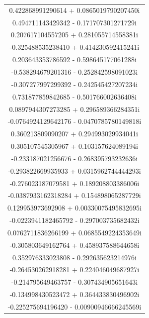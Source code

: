 \documentclass[12pt,a4paper,UTF8]{ctexart}
\begin{document}
\begin{enumerate}
\begin{longtable}{c}
              0.422868991290614      +   0.0865019790207450i  \\
              0.494711143429342      -   0.171707301271729i   \\
              0.207617104557205      +   0.281055714558381i   \\
              -0.325488535238410     +   0.414230592415241i   \\
              0.203643353786592      -   0.598645177061288i   \\
              -0.538294679201316     -   0.252842598091023i   \\
              -0.307277997299392     -   0.242545427207234i   \\
              0.731877859842685      -   0.501766002636408i   \\
              0.0897944307273285     +   0.296589366284351i   \\
              -0.0764924129642176    -   0.0470785780149818i  \\
              0.360213809090207      +   0.294993029934041i   \\
              0.305107545305967      +   0.103157624089194i   \\
              -0.233187021256676     -   0.268395793232636i   \\
              -0.293822669935933     +   0.0315962744444293i  \\
              -0.276023187079581     +   0.189208803386006i   \\
              -0.0387933162318284    +   0.154898065287729i   \\
              0.129953973692908      +   0.00330075495832695i \\
              -0.0223941182465792    -   0.297003735682432i   \\
              0.0762711836266199     +   0.0685549224353649i  \\
              -0.305803649162764     +   0.458937588644658i   \\
              0.352976333023808      -   0.292635623214976i   \\
              -0.264530262918281     +   0.224046049687927i   \\
              -0.214795649463757     -   0.307434905651643i   \\
              -0.134998430523472     +   0.364433830496902i   \\
              -0.225275694196420     -   0.00900946666245569i \\

\end{longtable}
\end{enumerate}
\end{document}
